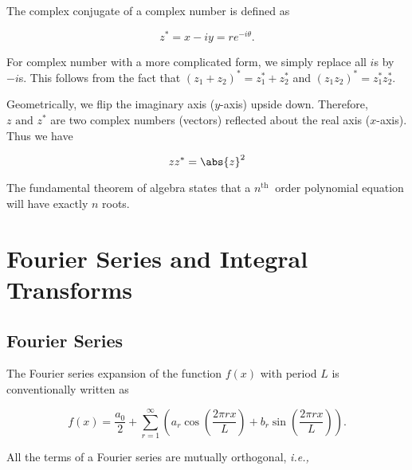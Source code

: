 \documentclass[english,a4paper,12pt]{report}
\begin{document}
The complex conjugate of a complex number is defined as 

\begin{equation}
	z^* = x-iy = re^{-i \theta }.
\end{equation}

For complex number with a more complicated form, we simply replace all \(i\)s by \(-i\)s. This follows from the fact that \((z_1 + z_2 )^* = z_1 ^* + z_2 ^*\) and \((z_1 z_2 )^* = z_1 ^* z_2 ^*\).  

Geometrically, we flip the imaginary axis (\(y\)-axis) upside down. Therefore, \(z \text { and } z^*\) are two complex numbers (vectors) reflected about the real axis (\(x\)-axis). Thus we have

\begin{equation}
	z z^* = \abs{z}^2 
\end{equation}




The fundamental theorem of algebra states that a \(n^{\text{th }} \) order polynomial equation will have exactly \(n\) roots. 

\chapter{Fourier Series and Integral Transforms}

\section{Fourier Series}

The Fourier series expansion of the function \(f(x)\) with period \(L\) is conventionally written as 

\begin{equation}
    f(x) = \frac{a_0 }{2} + \sum_{r=1}^{\infty} \left( a_{r} \cos \left( \frac{2\pi rx}{L}  \right) + b_{r} \sin \left( \frac{2\pi rx}{L}  \right)  \right). 
\end{equation}

All the terms of a Fourier series are mutually orthogonal, \textit{i.e.,} 
\end{document}
